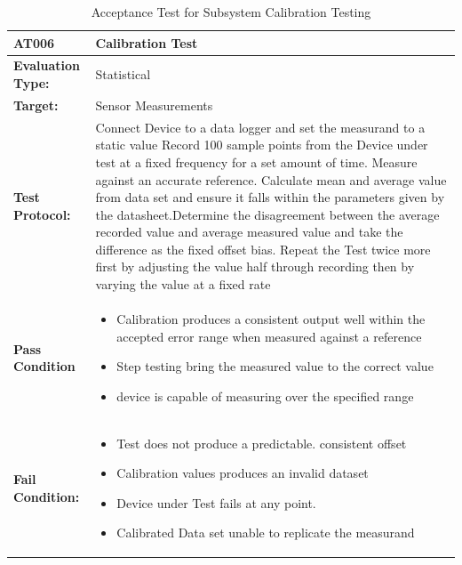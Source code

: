 \begin{table}[H]
    \centering
    \caption{Acceptance Test for Subsystem Calibration Testing}
    \begin{tabular}{|m{}|m{}|}
    \hline
   
   \textbf{AT006 }& \textbf{Calibration Test} \\
     \hline
    \textbf{Evaluation Type:} & Statistical \\
     \hline
    \textbf{Target: } & Sensor Measurements \\
    \hline
    \textbf{Test Protocol:} & Connect Device to a data logger and set the measurand to a static value Record 100 sample points from the Device under test at a fixed frequency for a set amount of time. Measure against an accurate reference. Calculate mean and average value from data set and ensure it falls within the parameters given by the datasheet.Determine the disagreement between the average recorded value and average measured value and take the difference as the fixed offset bias. Repeat the Test twice more first by adjusting the value half through recording then by varying the value at a fixed rate \\
    \hline
    \textbf{Pass Condition} & \vspace{5pt} \begin{itemize}
        \item Calibration produces a consistent output well within the accepted error range when measured against a reference
        \item Step testing bring the measured value to the correct value
        \item device is capable of measuring over the specified range
    \end{itemize}\\
    \hline
    \textbf{Fail Condition:} & \vspace{5pt} \begin{itemize}
        \item  Test does not produce a predictable. consistent offset
        \item  Calibration values produces an invalid dataset
        \item Device under Test fails at any point.
        \item Calibrated Data set unable to replicate the measurand
        \end{itemize}\\
        \hline
    \end{tabular}

    \label{tab:AT006}
\end{table}

